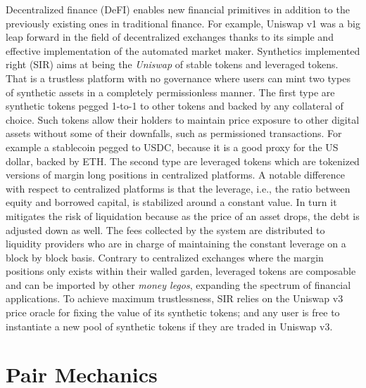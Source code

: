 \documentclass[journal,letterpaper,oneside,onecolumn,12pt]{IEEEtran}
\begin{document}
	Decentralized finance (DeFI) enables new financial primitives in addition to the previously existing ones in traditional finance. For example, Uniswap v1 was a big leap forward in the field of decentralized exchanges thanks to its simple and effective implementation of the automated market maker.
	Synthetics implemented right (SIR) aims at being the \textit{Uniswap} of stable tokens and leveraged tokens. That is a trustless platform with no governance where users can mint two types of synthetic assets in a completely permissionless manner. The first type are synthetic tokens pegged 1-to-1 to other tokens and backed by any collateral of choice. Such tokens allow their holders to maintain price exposure to other digital assets without some of their downfalls, such as permissioned transactions. For example a stablecoin  pegged to USDC, because it is a good proxy for the US dollar, backed by ETH. The second type are leveraged tokens which are tokenized versions of margin long positions in centralized platforms. 
	A notable difference with respect to centralized platforms is that the leverage, i.e., the ratio between equity and borrowed capital, is stabilized around a constant value. In turn it mitigates the risk of liquidation because as the price of an asset drops, the debt is adjusted down as well. 
	The fees collected by the system are distributed to liquidity providers who are in charge of maintaining the constant leverage on a block by block basis.	
	Contrary to centralized exchanges where the margin positions only exists within their walled garden, leveraged tokens are composable and can be imported by other \textit{money legos}, expanding the spectrum of financial applications.
	To achieve maximum trustlessness, SIR relies on the Uniswap v3 price oracle for fixing the value of its synthetic tokens; and any user is free to instantiate a new pool of synthetic tokens if they are traded in Uniswap v3.
	
	


	

	\section{Pair Mechanics}
	
\end{document}
